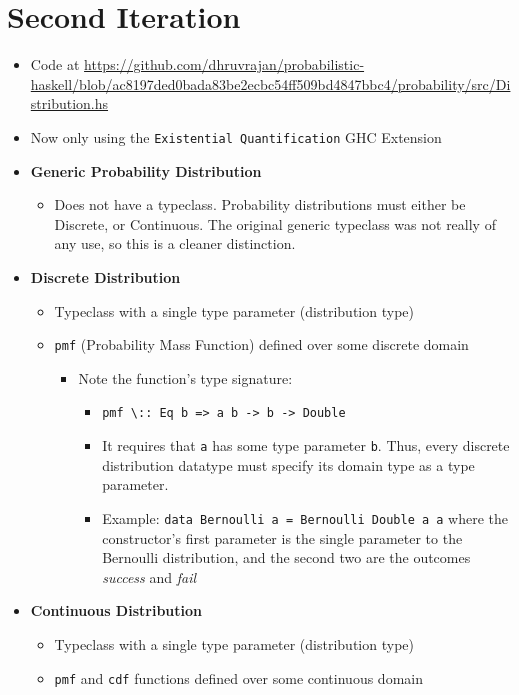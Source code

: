 \documentclass[11pt]{article}
\begin{document}
\section{Second Iteration}
\label{sec-2}
\begin{itemize}
\item Code at \url{https://github.com/dhruvrajan/probabilistic-haskell/blob/ac8197ded0bada83be2ecbc54ff509bd4847bbc4/probability/src/Distribution.hs}
\item Now only using the \texttt{Existential Quantification} GHC Extension
\item \textbf{Generic Probability Distribution}
\begin{itemize}
\item Does not have a typeclass. Probability distributions must either
be Discrete, or Continuous. The original generic typeclass was
not really of any use, so this is a cleaner distinction.
\end{itemize}
\item \textbf{Discrete Distribution}
\begin{itemize}
\item Typeclass with a single type parameter (distribution type)
\item \texttt{pmf} (Probability Mass Function) defined over some discrete domain
\begin{itemize}
\item Note the function's type signature:
\begin{itemize}
\item \texttt{pmf \textbackslash{}:: Eq b => a b -> b -> Double}
\item It requires that \texttt{a} has some type parameter \texttt{b}. Thus,
every discrete distribution datatype must specify its domain
type as a type parameter.
\item Example: \texttt{data Bernoulli a = Bernoulli Double a a} where the
constructor's first parameter is the single parameter to the
Bernoulli distribution, and the second two are the outcomes
\emph{success} and \emph{fail}
\end{itemize}
\end{itemize}
\end{itemize}
\item \textbf{Continuous Distribution}
\begin{itemize}
\item Typeclass with a single type parameter (distribution type)
\item \texttt{pmf} and \texttt{cdf} functions defined over some continuous domain

\end{itemize}
\end{itemize}
\end{document}
